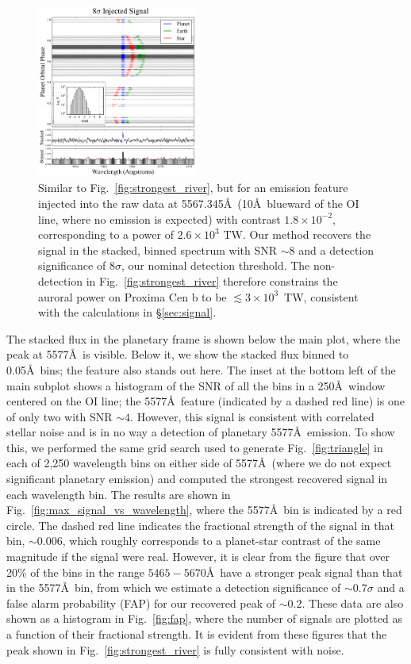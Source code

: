 \documentclass{emulateapj}
\newcommand{\XXX}[1]{#1}      %
\begin{document}
\begin{figure}[bt]
\includegraphics[width=0.47\textwidth]{5577_injection_river.pdf}
\caption{Similar to Fig.~\ref{fig:strongest_river}, but for an emission feature injected into the raw data at 5567.345\AA\ (10\AA\ blueward of the OI line, where no emission is expected) with contrast $1.8\times 10^{-2}$, \XXX{corresponding to a power of $2.6\times 10^3$ TW}. Our method recovers the signal in the stacked, binned spectrum with SNR ${\sim} 8$ and a detection significance of $8\sigma$, our nominal detection threshold. The non-detection in Fig.~\ref{fig:strongest_river} therefore constrains the auroral power on Proxima Cen b to be $\lesssim 3\times 10^{3}$~TW, consistent with the calculations in \S\ref{sec:signal}.\\[0in]}
\label{fig:injection_river}
\end{figure}

The stacked flux in the planetary frame is shown below the main plot, where the peak at 5577\AA\ is visible. Below it, we show the stacked flux binned to 0.05\AA\ bins; the feature also stands out here. The inset at the bottom left of the main subplot shows a histogram of the SNR of all the bins in a 250\AA\ window centered on the OI line; the 5577\AA\ feature (indicated by a dashed red line) is one of only two with SNR ${\sim} 4$. However, this signal is consistent with correlated stellar noise and is in no way a detection of planetary 5577\AA\ emission. To show this, we performed the same grid search used to generate Fig.~\ref{fig:triangle} in each of 2,250 wavelength bins on either side of 5577\AA\ (where we do not expect significant planetary emission) and computed the strongest recovered signal in each wavelength bin. The results are shown in Fig.~\ref{fig:max_signal_vs_wavelength}, where the 5577\AA\ bin is indicated by a red circle. The dashed red line indicates the fractional strength of the signal in that bin, ${\sim} 0.006$, which roughly corresponds to a planet-star contrast of the same magnitude if the signal were real. However, it is clear from the figure that over 20\% of the bins in the range $5465-5670$\AA\ have a stronger peak signal than that in the 5577\AA\ bin, from which we estimate a detection significance of ${\sim} 0.7\sigma$ and a false alarm probability (FAP) for our recovered peak of ${\sim} 0.2$. These data are also shown as a histogram in Fig.~\ref{fig:fap}, where the number of signals are plotted as a function of their fractional strength. It is evident from these figures that the peak shown in Fig.~\ref{fig:strongest_river} is fully consistent with noise.
\end{document}
